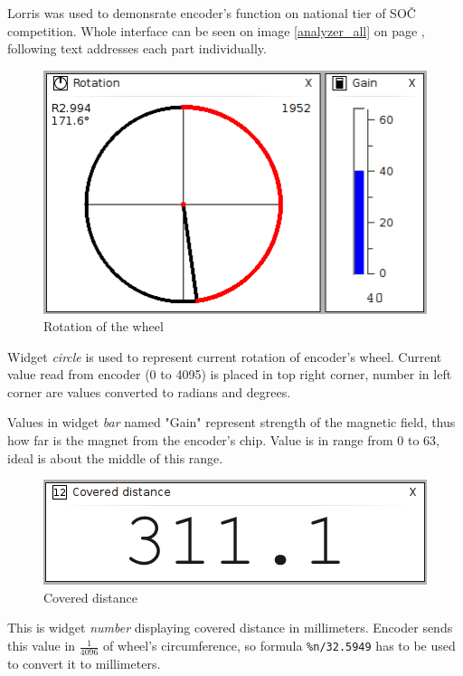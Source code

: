 \documentclass[12pt, a4paper, oneside]{article}
\newcommand{\It}{\textit}  %
\begin{document}
Lorris was used to demonsrate encoder's function on national tier of SOČ competition. Whole interface can be seen on image \ref{analyzer_all} on page \pageref{analyzer_all}, following text addresses each part individually.

\begin{figure}[H]
\begin{center}
\includegraphics[width=\textwidth-45pt]{img/enc_circle.png}
\caption{Rotation of the wheel}
\end{center}
\end{figure}
Widget \It{circle} is used to represent current rotation of encoder's wheel. Current value read from encoder (0 to 4095) is placed in top right corner, number in left corner are values converted to radians and degrees.

Values in widget \It{bar} named "Gain" represent strength of the magnetic field, thus how far is the magnet from the encoder's chip. Value is in range from 0 to 63, ideal is about the middle of this range.

\begin{figure}[H]
\begin{center}
\includegraphics[scale=0.85]{img/enc_dist.png}
\caption{Covered distance}
\end{center}
\end{figure}
This is widget \It{number} displaying covered distance in millimeters. Encoder sends this value in $\frac{1}{4096}$ of wheel's circumference, so formula \verb|%n/32.5949| has to be used to convert it to millimeters.
\end{document}
